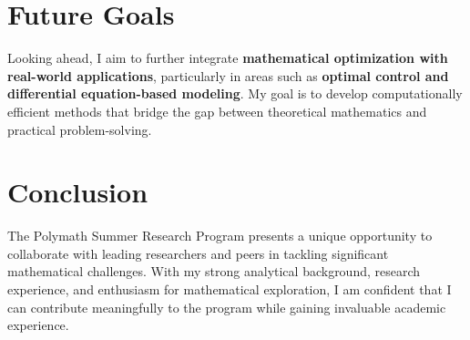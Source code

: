 \documentclass[a4paper,11pt]{article}
\begin{document}
\section*{Future Goals}
Looking ahead, I aim to further integrate \textbf{mathematical optimization with real-world applications}, particularly in areas such as \textbf{optimal control and differential equation-based modeling}. My goal is to develop computationally efficient methods that bridge the gap between theoretical mathematics and practical problem-solving.

\section*{Conclusion}
The Polymath Summer Research Program presents a unique opportunity to collaborate with leading researchers and peers in tackling significant mathematical challenges. With my strong analytical background, research experience, and enthusiasm for mathematical exploration, I am confident that I can contribute meaningfully to the program while gaining invaluable academic experience.

\end{document}
